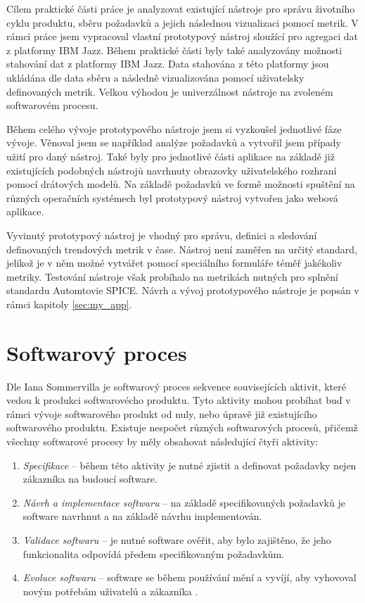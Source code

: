 \documentclass[czech,master,public,dept460,male,cpdeclaration,oneside]{diploma}
\begin{document}
Cílem praktické části práce je analyzovat existující nástroje pro správu životního cyklu produktu, sběru požadavků a jejich následnou vizualizaci pomocí metrik. V rámci práce jsem vypracoval vlastní prototypový nástroj sloužící pro agregaci dat z platformy IBM Jazz. Během praktické části byly také analyzovány možnosti stahování dat z platformy IBM Jazz. Data stahována z této platformy jsou ukládána dle data sběru a následně vizualizována pomocí uživatelsky definovaných metrik. Velkou výhodou je univerzálnost nástroje na zvoleném softwarovém procesu. 

\newpage

Během celého vývoje prototypového nástroje jsem si vyzkoušel jednotlivé fáze vývoje. Věnoval jsem se například analýze požadavků a vytvořil jsem případy užití pro daný nástroj. Také byly pro jednotlivé části aplikace na základě již existujících podobných nástrojů navrhnuty obrazovky uživatelského rozhraní pomocí drátových modelů. Na základě požadavků ve formě možnosti spuštění na různých operačních systémech byl prototypový nástroj vytvořen jako webová aplikace. 

Vyvinutý prototypový nástroj je vhodný pro správu, definici a sledování definovaných trendových metrik v čase. Nástroj není zaměřen na určitý standard, jelikož je v něm možné vytvářet pomocí speciálního formuláře téměř jakékoliv metriky. Testování nástroje však probíhalo na metrikách nutných pro splnění standardu Automtovie SPICE. Návrh a vývoj prototypového nástroje je popsán v rámci kapitoly \ref{sec:my_app}.

\section{Softwarový proces}
\label{sec:sw_process}

Dle Iana Sommervilla \cite{ref:sommerrville_sw_process} je softwarový proces sekvence souvisejících aktivit, které vedou k produkci softwarovécho produktu. Tyto aktivity mohou probíhat buď v rámci vývoje softwarového produkt od nuly, nebo úpravě již existujícího softwarového produktu. Existuje nespočet různých softwarových procesů, přičemž všechny softwarové procesy by měly obsahovat následující čtyři aktivity:

\begin{enumerate}
\item \textit{Specifikace} -- během této aktivity je nutné zjistit a definovat požadavky nejen zákazníka na budoucí software.
\item \textit{Návrh a implementace softwaru} -- na základě specifikovaných požadavků je software navrhnut a na základě návrhu implementován.
\item \textit{Validace softwaru }-- je nutné software ověřit, aby bylo zajištěno, že jeho funkcionalita odpovídá předem specifikovaným požadavkům.
\item \textit{Evoluce softwaru} -- software se během používání mění a vyvíjí, aby vyhovoval novým potřebám uživatelů a zákazníka .
\end{enumerate}
\end{document}
